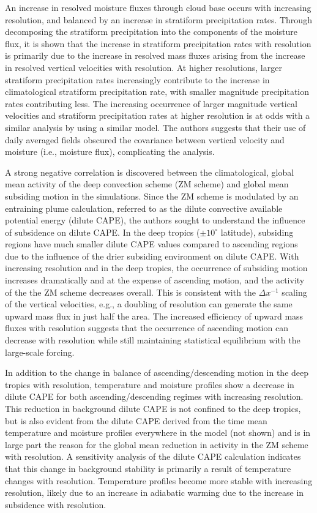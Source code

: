 \documentclass[alpha-refs]{wiley-article}
\begin{document}
An increase in resolved moisture fluxes through cloud base occurs with increasing resolution, and balanced by an increase in stratiform precipitation rates. Through decomposing the stratiform precipitation into the components of the moisture flux, it is shown that the increase in stratiform precipitation rates with resolution is primarily due to the increase in resolved mass fluxes arising from the increase in resolved vertical velocities with resolution. At higher resolutions, larger stratiform precipitation rates increasingly contribute to the increase in climatological stratiform precipitation rate, with smaller magnitude precipitation rates contributing less. The increasing occurrence of larger magnitude vertical velocities and stratiform precipitation rates at higher resolution is at odds with a similar analysis by \cite{TETAL2018CD} using a similar model. The authors suggests that their use of daily averaged fields obscured the covariance between vertical velocity and moisture (i.e., moisture flux), complicating the analysis.

A strong negative correlation is discovered between the climatological, global mean activity of the \cite{ZM1995AO} deep convection scheme (ZM scheme) and global mean subsiding motion in the simulations. Since the ZM scheme is modulated by an entraining plume calculation, referred to as the dilute convective available potential energy (dilute CAPE), the authors sought to understand the influence of subsidence on dilute CAPE. In the deep tropics ($\pm 10^{\circ}$ latitude), subsiding regions have much smaller dilute CAPE values compared to ascending regions due to the influence of the drier subsiding environment on dilute CAPE. With increasing resolution and in the deep tropics, the occurrence of subsiding motion increases dramatically and at the expense of ascending motion, and the activity of the the ZM scheme decreases overall. This is consistent with the $\Delta x^{-1}$ scaling of the vertical velocities, e.g., a doubling of resolution can generate the same upward mass flux in just half the area. The increased efficiency of upward mass fluxes with resolution suggests that the occurrence of ascending motion can decrease with resolution while still maintaining statistical equilibrium with the large-scale forcing.

In addition to the change in balance of ascending/descending motion in the deep tropics with resolution, temperature and moisture profiles show a decrease in dilute CAPE for both ascending/descending regimes with increasing resolution. This reduction in background dilute CAPE is not confined to the deep tropics, but is also evident from the dilute CAPE derived from the time mean temperature and moisture profiles everywhere in the model (not shown) and is in large part the reason for the global mean reduction in activity in the ZM scheme with resolution. A sensitivity analysis of the dilute CAPE calculation indicates that this change in background stability is primarily a result of temperature changes with resolution. Temperature profiles become more stable with increasing resolution, likely due to an increase in adiabatic warming due to the increase in subsidence with resolution. 
\end{document}
